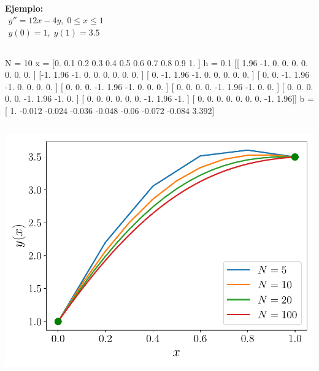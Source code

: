 \documentclass[9pt, aspectratio=169]{beamer}
\begin{document}
\begin{frame}
\begin{columns}[t]
\textbf{Ejemplo:}
\[ \begin{split} y'' = 12 x - 4 y, \; 0 \leq x \leq 1 \\ y(0) = 1,\; y(1) = 3.5 \end{split} \]

\end{columns}
\end{frame}

\begin{frame}[fragile]
    \begin{columns}

\begin{shell}
N = 10
x =  [0.  0.1 0.2 0.3 0.4 0.5 0.6 0.7 0.8 0.9 1. ] h =  0.1
[[ 1.96 -1.    0.    0.    0.    0.    0.    0.    0.  ]
 [-1.    1.96 -1.    0.    0.    0.    0.    0.    0.  ]
 [ 0.   -1.    1.96 -1.    0.    0.    0.    0.    0.  ]
 [ 0.    0.   -1.    1.96 -1.    0.    0.    0.    0.  ]
 [ 0.    0.    0.   -1.    1.96 -1.    0.    0.    0.  ]
 [ 0.    0.    0.    0.   -1.    1.96 -1.    0.    0.  ]
 [ 0.    0.    0.    0.    0.   -1.    1.96 -1.    0.  ]
 [ 0.    0.    0.    0.    0.    0.   -1.    1.96 -1.  ]
 [ 0.    0.    0.    0.    0.    0.    0.   -1.    1.96]]
b =  [ 1.    -0.012 -0.024 -0.036 -0.048 -0.06  -0.072 -0.084  3.392]
\end{shell}
\end{columns}
\end{frame}

\begin{frame}
\begin{center}
    \includegraphics[scale=0.6]{code/dif-finitas.pdf}
\end{center}
\end{frame}
\end{document}
